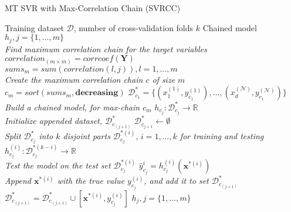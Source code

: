 \documentclass[preprint,12pt]{elsarticle}
\begin{document}
\begin{algorithm}[t!]
\caption{MT SVR with Max-Correlation Chain (SVRCC)}
\label{alg:SVRCC} 
\begin{algorithmic}[1]
\renewcommand{\algorithmicrequire}{\textbf{Input:}}
\renewcommand{\algorithmicensure}{\textbf{Output:}}
\REQUIRE Training dataset $\mathcal{D}$, number of cross-validation folds $k$
\ENSURE  Chained model $h_j, j = \{1,\ldots,m\}$
\\ \textit{Find maximum correlation chain for the target variables}
\STATE $correlation_{\left(m \times m\right)} = corrcoef(\bm Y)$
\STATE $sums_m = sum\left(correlation\left(l,j\right)\right), l=1,\ldots,m$
\\ \textit{Create the maximum correlation chain $c$ of size $m$}
\STATE $c_m = sort\left(sums_m,\textbf{decreasing}\right)$
\STATE $\mathcal{D}_{c_1}^* = \{(x_1^{(1)},y_{c_1}^{(1)}),\ldots,(x_d^{(\mathcal N)},y_{c_1}^{(\mathcal N)})\}$
\\ \textit{Build a chained model, for max-chain $c_m$}
\STATE $h_{c_j} : \mathcal{D}_{c_j}^* \rightarrow \mathbb{R}$
\\ \textit{Initialize appended dataset, $\mathcal{D}_{c_{(j+1)}}^*$}
\STATE $\mathcal{D}_{c_{j+1}}^* \leftarrow \emptyset$
\\ \textit{Split $\mathcal{D}_{c_j}^*$ into $k$ disjoint parts $\mathcal{D}_{c_j}^{*(i)}, \, i=1,\ldots,k$ for training and testing}
\STATE $h_{c_j}^{(i)} : \mathcal{D}_{c_j}^{*(k-i)} \rightarrow \mathbb{R}$
\\ \textit{Test the model on the test set $\mathcal{D}_{c_j}^{*(i)}$}
\STATE $\hat{y}_{c_j}^i = h_{c_j}^{(i)}(\bm x^{*(i)})$
\\ \textit{Append $\bm x^{*(i)}$ with the true value $y_{c_j}^{(i)}$, and add it to set $\mathcal{D}_{c_{(j+1)}}^*$}
\STATE $\mathcal{D}_{c_{(j+1)}}^* = \mathcal{D}_{c_{(j+1)}}^* \cup [\bm x^{*(i)},y_{c_j}^{(i)}]$
\ENDFOR
\ENDFOR
\ENDIF
\ENDFOR
\RETURN $h_j, j = \{1,\ldots,m\}$
\end{algorithmic} 
\end{algorithm}
\end{document}
